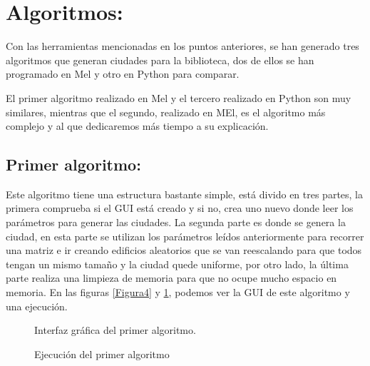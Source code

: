 \section{Algoritmos:}

Con las herramientas mencionadas en los puntos anteriores, se han generado tres algoritmos que generan ciudades para la biblioteca, dos de ellos se han programado en Mel y otro en Python para comparar.

El primer algoritmo realizado en Mel y el tercero realizado en Python son muy similares, mientras que el segundo, realizado en MEl, es el algoritmo más complejo y al que dedicaremos más tiempo a su explicación.

\subsection{Primer algoritmo:}

Este algoritmo tiene una estructura bastante simple, está divido en tres partes, la primera comprueba si el GUI está creado y si no, crea uno nuevo donde leer los parámetros para generar las ciudades. La segunda parte es donde se genera la ciudad, en esta parte se utilizan los parámetros leídos anteriormente para recorrer una matriz e ir creando edificios aleatorios que se van reescalando para que todos tengan un mismo tamaño y la ciudad quede uniforme, por otro lado, la última parte realiza una limpieza de memoria para que no ocupe mucho espacio en memoria. En las figuras \ref{Figura4} y \ref{Figura5}, podemos ver la GUI de este algoritmo y una ejecución.

\begin{figure}[h] %

\hfill
\begin{minipage}[t]{.45\textwidth}
\begin{center}
\caption{Interfaz gráfica del primer algoritmo.}
\label{Figura4}
\end{center}
\end{minipage}
\hfill
\begin{minipage}[t]{.45\textwidth}
\begin{center}
\caption{Ejecución del primer algoritmo}
\label{Figura5}
\end{center}
\end{minipage}
\hfill
\end{figure}

